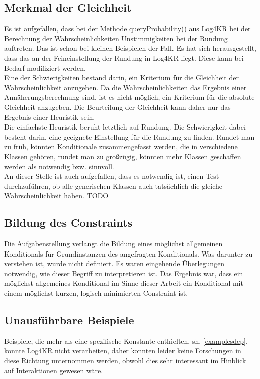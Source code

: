 \documentclass[a4paper, 11pt]{book}
\begin{document}
\subsection{Merkmal der Gleichheit} \label{Gleichheit}
Es ist aufgefallen, dass bei der Methode queryProbability() aus Log4KR bei der Berechnung der Wahrscheinlichkeiten Unstimmigkeiten bei der Rundung auftreten. Das ist schon bei kleinen Beispielen der Fall. Es hat sich herausgestellt, dass das an der Feineinstellung der Rundung in Log4KR liegt. Diese kann bei Bedarf modifiziert werden.\\
Eine der Schwierigkeiten bestand darin, ein Kriterium für die Gleichheit der Wahrscheinlichkeit anzugeben. Da die Wahrscheinlichkeiten das Ergebnis einer Annäherungsberechnung sind, ist es nicht möglich, ein Kriterium für die absolute Gleichheit anzugeben. Die Beurteilung der Gleichheit kann daher nur das Ergebnis einer Heuristik sein.\\
Die einfachste Heuristik beruht letztlich auf Rundung. Die Schwierigkeit dabei besteht darin, eine geeignete Einstellung für die Rundung zu finden. Rundet man zu früh, könnten Konditionale zusammengefasst werden, die in verschiedene Klassen gehören, rundet man zu großzügig, könnten mehr Klassen geschaffen werden als notwendig bzw. sinnvoll.\\
An dieser Stelle ist auch aufgefallen, dass es notwendig ist, einen Test durchzuführen, ob alle generischen Klassen auch tatsächlich die gleiche Wahrscheinlichkeit haben. TODO

\subsection{Bildung des Constraints}
Die Aufgabenstellung verlangt die Bildung eines möglichst allgemeinen Konditionals für Grundinstanzen des angefragten Konditionals. Was darunter zu verstehen ist, wurde nicht definiert. Es waren eingehende Überlegungen notwendig, wie dieser Begriff zu interpretieren ist. Das Ergebnis war, dass ein möglichst allgemeines Konditional im Sinne dieser Arbeit ein Konditional mit einem möglichst kurzen, logisch minimierten Constraint ist.


\subsection{Unausführbare Beispiele} \label{Beispiele unausfuehrbar} 
Beispiele, die mehr als eine spezifische Konstante enthielten, sh. \ref{examplesdep}, konnte Log4KR nicht verarbeiten, daher konnten leider keine Forschungen in diese Richtung unternommen werden, obwohl dies sehr interessant im Hinblick auf Interaktionen gewesen wäre. 
\end{document}
